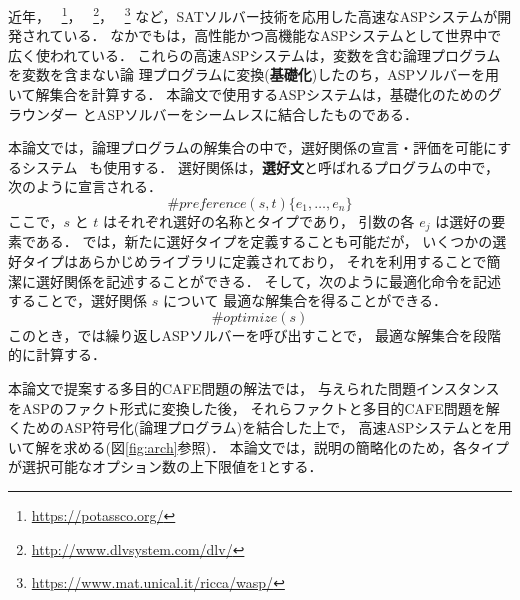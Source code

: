 近年，
{\clingo}~\footnote{\url{https://potassco.org/}}，
{\dlv}~\footnote{\url{http://www.dlvsystem.com/dlv/}}，
{\wasp}~\footnote{\url{https://www.mat.unical.it/ricca/wasp/}}
など，SATソルバー技術を応用した高速なASPシステムが開発されている．
なかでも{\clingo}は，高性能かつ高機能なASPシステムとして世界中で広く使われている．
これらの高速ASPシステムは，変数を含む論理プログラムを変数を含まない論
理プログラムに変換(\textbf{基礎化})したのち，ASPソルバーを用いて解集合を計算する．
本論文で使用するASPシステム{\clingo}は，基礎化のためのグラウンダー
{\gringo}とASPソルバー{\clasp}をシームレスに結合したものである．

本論文では，論理プログラムの解集合の中で，選好関係の宣言・評価を可能にするシステム
{\asprin}~\cite{Brewka15:casp}も使用する．
選好関係は，{\bf 選好文}と呼ばれるプログラムの中で，次のように宣言される．
\begin{equation}
  \label{eq:preference}
  \#preference(s,t)\{e_1,\dots,e_n\}
\end{equation}
ここで，$s$ と $t$ はそれぞれ選好の名称とタイプであり，
引数の各 $e_j$ は選好の要素である． 
{\asprin} では，新たに選好タイプを定義することも可能だが，
いくつかの選好タイプはあらかじめライブラリに定義されており，
それを利用することで簡潔に選好関係を記述することができる．
そして，次のように最適化命令を記述することで，選好関係 $s$ について
最適な解集合を得ることができる．
\begin{equation}
 \label{eq:optimize}
 \#optimize(s)
\end{equation} 
このとき，{\asprin}では繰り返しASPソルバーを呼び出すことで，
最適な解集合を段階的に計算する．

本論文で提案する多目的CAFE問題の解法では，
与えられた問題インスタンスをASPのファクト形式に変換した後，
それらファクトと多目的CAFE問題を解くためのASP符号化(論理プログラム)を結合した上で，
高速ASPシステム{\clingo}と{\asprin}を用いて解を求める(図\ref{fig:arch}参照)．
本論文では，説明の簡略化のため，各タイプが選択可能なオプション数の上下限値を1とする．

